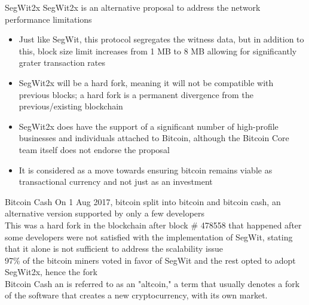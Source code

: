 \documentclass[10pt]{beamer}
\begin{document}

\begin{frame}{SegWit2x}
	SegWit2x is an alternative proposal to address the network performance limitations
	\begin{itemize}
		\item Just like SegWit, this protocol segregates the witness data, but in addition to this, block size limit increases from 1 MB to 8 MB allowing for significantly grater transaction rates
		\item SegWit2x will be a hard fork, meaning it will not be compatible with previous blocks; a hard fork is a permanent divergence from the previous/existing blockchain
		\item SegWit2x does have the support of a significant number of high-profile businesses and individuals attached to Bitcoin, although the Bitcoin Core team itself does not endorse the proposal
		\item It is considered as a move towards ensuring bitcoin remains viable as transactional currency and not just as an investment
	\end{itemize}
\end{frame}



\begin{frame}{Bitcoin Cash}
	On 1 Aug 2017, bitcoin split into bitcoin and bitcoin cash, an alternative version supported by only a few developers \\ \vspace{3mm}
	This was a hard fork in the blockchain after block \# 478558 that happened after some developers were not satisfied with the implementation of SegWit, stating that it alone is not sufficient to address the scalability issue \\ \vspace{3mm}
	97\% of the bitcoin miners voted in favor of SegWit and the rest opted to adopt SegWit2x, hence the fork\\ \vspace{3mm}
	Bitcoin Cash an is referred to as an  "altcoin," a term that usually denotes a fork of the software that creates a new cryptocurrency, with its own market. \\ \vspace{3mm}
\end{frame}
\end{document}
